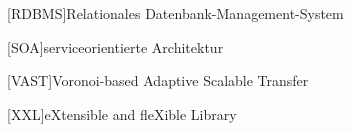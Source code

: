 \begin{acronym}[xxxxxxxxxxxx]
	[RDBMS]{Relationales Datenbank-Management-System}
	
	\vspace{\parsep}
	[SOA]{serviceorientierte Architektur}
	
	\vspace{\parsep}

	\vspace{\parsep}
	[VAST]{Voronoi-based Adaptive Scalable Transfer}


	\vspace{\parsep}
	[XXL]{eXtensible and fleXible Library}



\end{acronym}
